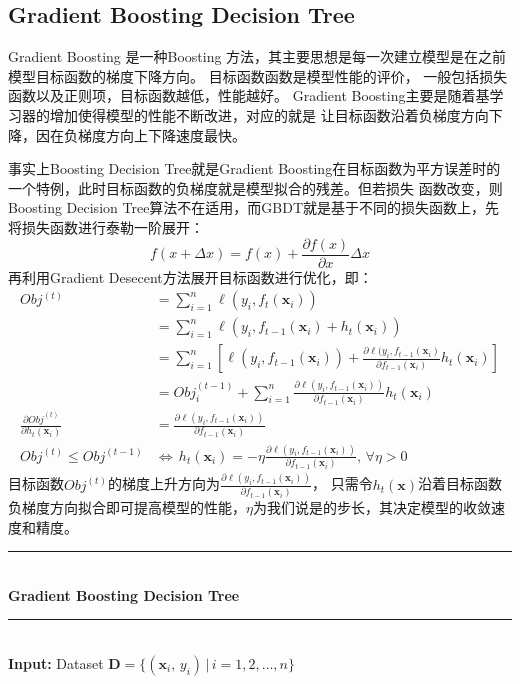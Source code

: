 \documentclass[a4paper]{article}
\begin{document}
	\subsection{Gradient Boosting Decision Tree}
		Gradient Boosting 是一种Boosting 方法，其主要思想是每一次建立模型是在之前模型目标函数的梯度下降方向。 目标函数函数是模型性能的评价，
		一般包括损失函数以及正则项，目标函数越低，性能越好。 Gradient Boosting主要是随着基学习器的增加使得模型的性能不断改进，对应的就是
		让目标函数沿着负梯度方向下降，因在负梯度方向上下降速度最快。\par
		事实上Boosting Decision Tree就是Gradient Boosting在目标函数为平方误差时的一个特例，此时目标函数的负梯度就是模型拟合的残差。但若损失
		函数改变，则Boosting Decision Tree算法不在适用，而GBDT就是基于不同的损失函数上，先将损失函数进行泰勒一阶展开：
		$$f(x+\Delta x) = f(x) + \frac{\partial f(x)}{\partial x}\Delta x$$
		再利用Gradient Desecent方法展开目标函数进行优化，即：
		\begin{align*}
			Obj^{(t)} 	
				&=\sum_{i=1}^{n}\ell(y_i, f_t(\textbf{x}_i)) \\
				&=\sum_{i=1}^{n}\ell(y_i, f_{t-1}(\textbf{x}_i)+h_t(\textbf{x}_i)) \\
				&=\sum_{i=1}^{n}\left[\ell(y_i,f_{t-1}(\textbf{x}_i))+\frac{\partial\ell(y_i,f_{t-1}(\textbf{x}_i)}{\partial f_{t-1}(\textbf{x}_i)}h_t(\textbf{x}_i)\right]\\
				&=Obj_i^{(t-1)}+ \sum_{i=1}^{n}\frac{\partial \ell(y_i, f_{t-1}(\textbf{x}_i))}{\partial f_{t-1}(\textbf{x}_i)}h_t(\textbf{x}_i)\\
			\frac{\partial Obj^{(t)}}{\partial h_t(\textbf{x}_i)} 
				&=\frac{\partial \ell(y_i, f_{t-1}(\textbf{x}_i))}{\partial f_{t-1}(\textbf{x}_i)}\\
			Obj^{(t)} \leq Obj^{(t-1)} 
				&\Leftrightarrow\,h_t(\textbf{x}_i) = -\eta \frac{\partial \ell(y_i, f_{t-1}(\textbf{x}_i))}{\partial f_{t-1}(\textbf{x}_i)},\, \forall \eta > 0
		\end{align*}
		目标函数$Obj^{(t)}$的梯度上升方向为$\frac{\partial \ell(y_i, f_{t-1}(\textbf{x}_i))}{\partial f_{t-1}(\textbf{x}_i)}$，
		只需令$h_t(\textbf{x})$沿着目标函数负梯度方向拟合即可提高模型的性能，$\eta$为我们说是的步长，其决定模型的收敛速度和精度。\\
		\noindent\rule[0.10\baselineskip]{\textwidth}{0.75pt}\\
		\textbf{Gradient Boosting Decision Tree}\\
		\noindent\rule[0.10\baselineskip]{\textwidth}{0.5pt}\\
		\textbf{Input:}	Dataset $\textbf{D} = \{(\textbf{x}_i,\,y_i)\,|\,i = 1, 2,\dots, n\}$\\
\end{document}
